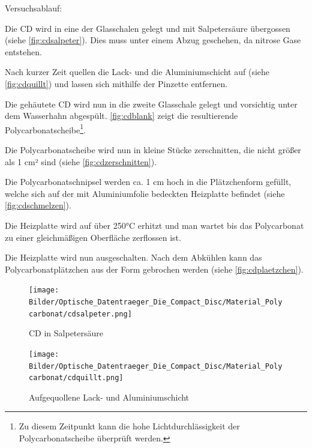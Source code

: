 Versuchsablauf:
\begin{enumerate*}
    \item Die CD wird in eine der Glasschalen gelegt und mit Salpetersäure übergossen (siehe \autoref{fig:cdsalpeter}). Dies muss unter einem Abzug geschehen, da nitrose Gase entstehen.
    \item Nach kurzer Zeit \glqq quellen\grqq{} die Lack- und die Aluminiumschicht auf (siehe \autoref{fig:cdquillt}) und lassen sich mithilfe der Pinzette entfernen.
    \item Die \glqq gehäutete\grqq{} CD wird nun in die zweite Glasschale gelegt und vorsichtig unter dem Wasserhahn abgespült. \autoref{fig:cdblank} zeigt die resultierende Polycarbonatscheibe\footnote{Zu diesem Zeitpunkt kann die hohe Lichtdurchlässigkeit der Polycarbonatscheibe überprüft werden.}.
    \item Die Polycarbonatscheibe wird nun in kleine Stücke zerschnitten, die nicht größer als 1 cm² sind (siehe \autoref{fig:cdzerschnitten}).
    \item Die Polycarbonatschnipsel werden ca. 1 cm hoch in die Plätzchenform gefüllt, welche sich auf der mit Aluminiumfolie bedeckten Heizplatte befindet (siehe \autoref{fig:cdschmelzen}).
    \item Die Heizplatte wird auf über 250°C erhitzt und man wartet bis das Polycarbonat zu einer gleichmäßigen Oberfläche zerflossen ist.
    \item Die Heizplatte wird nun ausgeschalten. Nach dem Abkühlen kann das \glqq Polycarbonatplätzchen\grqq{} aus der Form gebrochen werden (siehe \autoref{fig:cdplaetzchen}).
\end{enumerate*}

\begin{figure}[h]
    \begin{center}
        \begin{minipage}[t]{0.4\textwidth}
            \begin{center}
                \texttt{[image: Bilder/Optische\_Datentraeger\_Die\_Compact\_Disc/Material\_Polycarbonat/cdsalpeter.png]}
                \caption[CD in Salpetersäure]{CD in Salpetersäure}
                \label{fig:cdsalpeter}
            \end{center}
        \end{minipage}
        \hspace{0.025\textwidth}
        \begin{minipage}[t]{0.4\textwidth}
            \begin{center}
                \texttt{[image: Bilder/Optische\_Datentraeger\_Die\_Compact\_Disc/Material\_Polycarbonat/cdquillt.png]}
                \caption[\qlqq Aufgequolleney\grqq{} Lack- und Aluminiumschicht]{\glqq Aufgequollene\grqq{} Lack- und Aluminiumschicht}
                \label{fig:cdquillt}
            \end{center}
        \end{minipage}
    \end{center}
\end{figure}

